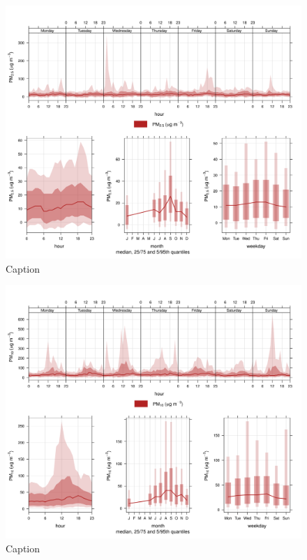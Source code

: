 \documentclass{nwureport}
\begin{document}
\begin{figure}[!htb]
    \centering
    \includegraphics[width=\textwidth]{images/Wedela_pm2-5_timevary.png}
    \caption{Caption}
    \label{fig:summary}
\end{figure}

\begin{figure}[!htb]
    \centering
    \includegraphics[width=\textwidth]{images/Wedela_pm10_timevary.png}
    \caption{Caption}
    \label{fig:summary}
\end{figure}
\end{document}
